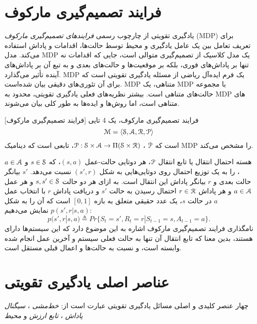 \section{فرایند تصمیم‌گیری مارکوف}

یادگیری تقویتی از چارچوب رسمی \textit{فرایندهای تصمیم‌گیری مارکوف} 
 (MDP)
 برای تعریف تعامل بین یک عامل یادگیری و محیط توسط حالت‌ها، اقدامات و پاداش استفاده می‌کند. مدل MDP یک مدل کلاسیک از تصمیم‌گیری متوالی است، جایی که اقدامات نه تنها بر پاداش‌های فوری، بلکه بر موقعیت‌ها و حالت‌های بعدی و به تبع آن بر پاداش‌های آینده تأثیر می‌گذارد.
MDP
 یک فرم ایده‌آل ریاضی از مسئله یادگیری تقویتی است که برای آن تئوری‌های دقیقی بیان شده‌است.
MDP متناهی،
 یک MDP با مجموعه حالت‌های متناهی است. 
بیشتر نظریه‌های فعلی یادگیری تقویتی، محدود به MDP  های متناهی است، اما روش‌ها و ایده‌ها به طور کلی بیان می‌شوند.


[فرایند تصمیم‌گیری مارکوف] 
 فرایند تصمیم‌گیری مارکوف، یک 4 تایی 
$$\EuScript{M} = \left< \EuScript{S},\EuScript{A},\EuScript{R},\EuScript{P} \right>$$
است که
$\EuScript{P}$
 ،
$ \EuScript{P}: \EuScript{S} \times \EuScript{A} \to \Pi(\EuScript{S} \times \EuScript{R})$، 
تابعی است که دینامیک MDP را مشخص می‌کند.


هسته احتمال انتقال یا تابع انتقال $\EuScript{P}$، هر دوتایی حالت-عمل
$(s,a)$، که 
$s \in \EuScript{S}$
و
$a \in \EuScript{A}$، را به یک توزیع احتمال روی دوتایی‌هایی به شکل 
$(s',r)$
نسبت می‌دهد. $s'$ بیانگر حالت بعدی و $r$ بیانگر پاداش این انتقال است. به ازای هر دو حالت 
$s,s' \in \EuScript{S}$
 و هر عمل 
 $a \in \EuScript{A}$
  و هر پاداش 
  $r \in \EuScript{R}$
  احتمال رسیدن به حالت $s'$ و دریافت پاداش $r$ با انتخاب عمل $a$ در حالت $s$، یک عدد حقیقی متعلق به  بازه $[0,1]$ است که آن را به شکل
$p(s',r|s,a)$
نمایش می‌دهیم:
$$p(s',r|s,a) \triangleq Pr\{S_t=s',R_t=r|S_{t-1}=s,A_{t-1}=a\}.$$ 
نامگذاری فرایند تصمیم‌گیری مارکوف اشاره به این موضوع دارد که این سیستم‌ها دارای   هستند، بدین معنا که تابع انتقال آن تنها به حالت فعلی سیستم و آخرین عمل انجام شده وابسته است، و نسبت به حالت‌ها و اعمال قبلی مستقل است.
\section{عناصر اصلی یادگیری تقویتی}
چهار عنصر کلیدی و اصلی مسائل یادگیری تقویتی عبارت است از:
\textit{خط‌مشی} ، 
\textit{سیگنال پاداش} ،
\textit{تابع ارزش}  
و
\textit{محیط} 
